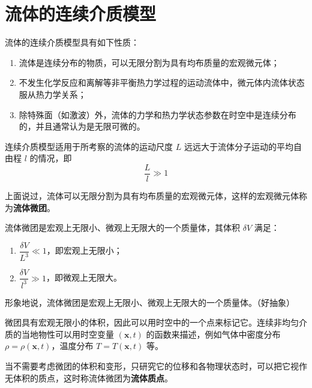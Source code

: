 

\section{流体的连续介质模型}

流体的连续介质模型具有如下性质：
\begin{enumerate}
	\item 流体是连续分布的物质，可以无限分割为具有均布质量的宏观微元体；
	\item 不发生化学反应和离解等非平衡热力学过程的运动流体中，微元体内流体状态服从热力学关系；
	\item 除特殊面（如激波）外，流体的力学和热力学状态参数在时空中是连续分布的，并且通常认为是无限可微的。
\end{enumerate}

\begin{keybox}[连续介质模型的适用条件]
	连续介质模型适用于所考察的流体的运动尺度 $L$ 远远大于流体分子运动的平均自由程 $l$ 的情况，即
	\[
	\frac{L}{l}\gg 1
	\]
\end{keybox}

上面说过，流体可以无限分割为具有均布质量的宏观微元体，这样的宏观微元体称为\textbf{流体微团}。

\begin{definition}[流体微团]
	流体微团是宏观上无限小、微观上无限大的一个质量体，其体积 $\delta V$ 满足：
	\begin{enumerate}
		\item $\dfrac{\delta V}{L^3}\ll 1$，即宏观上无限小；
		\item $\dfrac{\delta V}{l^3}\gg 1$，即微观上无限大。
	\end{enumerate}
\end{definition}

\begin{note}
	形象地说，流体微团是宏观上无限小、微观上无限大的一个质量体。（好抽象）
\end{note}

微团具有宏观无限小的体积，因此可以用时空中的一个点来标记它。连续非均匀介质的当地物性可以用时空变量 $(\boldsymbol{x},t)$ 的函数来描述，例如气体中密度分布 $\rho=\rho(\boldsymbol{x},t)$，温度分布 $T=T(\boldsymbol{x},t)$ 等。

\begin{definition}[流体质点]
	当不需要考虑微团的体积和变形，只研究它的位移和各物理状态时，可以把它视作无体积的质点，这时称流体微团为\textbf{流体质点}。
\end{definition}

